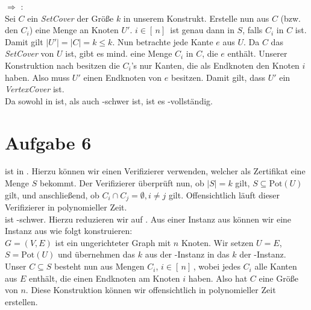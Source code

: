 \documentclass[a4paper,11pt]{scrartcl}
\begin{document}
	 $\Rightarrow$ :\\
	Sei $C$ ein \textit{SetCover} der Größe $k$ in unserem Konstrukt. Erstelle nun aus $C$ (bzw. den $C_i$) eine Menge an Knoten $U'$. $i \in [\, n ]\,$ ist genau dann in $S$, falls $C_i$ in $C$ ist. Damit gilt $\vert U' \vert = \vert C \vert = k \leq k$. Nun betrachte jede Kante $e$ aus $U$. Da $C$ das \textit{SetCover} von $U$ ist, gibt es mind. eine Menge $C_i$ in $C$, die $e$ enthält. Unserer Konstruktion nach besitzen die $C_i$'s nur Kanten, die als Endknoten den Knoten $i$ haben. Also muss $U'$ einen Endknoten von $e$ besitzen. Damit gilt, dass $U'$ ein \textit{VertexCover} ist.\\
	
	Da  sowohl in  ist, als auch -schwer ist, ist es -vollständig.

\newpage

	\section*{Aufgabe 6}
	 ist in . Hierzu können wir einen Verifizierer verwenden, welcher als Zertifikat eine Menge $S$ bekommt. Der Verifizierer überprüft nun, ob $\vert S \vert = k$ gilt, $S \subseteq \text{Pot}(U)$ gilt, und anschließend, ob $C_i \cap C_j = \emptyset, i \neq j$ gilt. Offensichtlich läuft dieser Verifizierer in polynomieller Zeit.\\
	
	 ist -schwer. Hierzu reduzieren wir  auf . Aus einer Instanz aus  können wir eine Instanz aus  wie folgt konstruieren:\\
	$G=(V,E)$ ist ein ungerichteter Graph mit $n$ Knoten. Wir setzen $U = E$, $S = \text{Pot}(U)$ und übernehmen das $k$ aus der -Instanz in das $k$ der -Instanz. Unser $C \subseteq S$ besteht nun aus Mengen $C_i$, $i \in [\, n ]\,$, wobei jedes $C_i$ alle Kanten aus $E$ enthält, die einen Endknoten am Knoten $i$ haben. Also hat $C$ eine Größe von $n$. Diese Konstruktion können wir offensichtlich in polynomieller Zeit erstellen.\\
	
\end{document}
